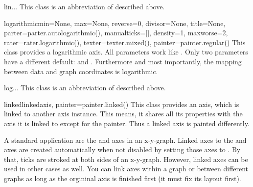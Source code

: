 \begin{classdesc}{lin}{...}
  This class is an abbreviation of  described above.
\end{classdesc}

\begin{classdesc}{logarithmic}{min=None, max=None, reverse=0, divisor=None, title=None,
                               parter=parter.autologarithmic(), manualticks=[],
                               density=1, maxworse=2, rater=rater.logarithmic(),
                               texter=texter.mixed(), painter=painter.regular()}
  This class provides a logarithmic axis. All parameters work like
  . Only two parameters have a different default:
   and . Furthermore and most importantly, the
  mapping between data and graph coordinates is logarithmic.
\end{classdesc}

\begin{classdesc}{log}{...}
This class is an abbreviation of  described above.
\end{classdesc}

\begin{classdesc}{linked}{linkedaxis, painter=painter.linked()}
  This class provides an axis, which is linked to another axis
  instance. This means, it shares all its properties with the axis it
  is linked to except for the painter. Thus a linked axis is painted
  differently.

  A standard application are the  and  axes in an
  x-y-graph. Linked axes to the  and  axes are created
  automatically when not disabled by setting those axes to
  . By that, ticks are stroked at both sides of an
  x-y-graph. However, linked axes can be used in other cases as
  well. You can link axes within a graph or between different graphs
  as long as the orgininal axis is finished first (it must fix its
  layout first).
\end{classdesc}

